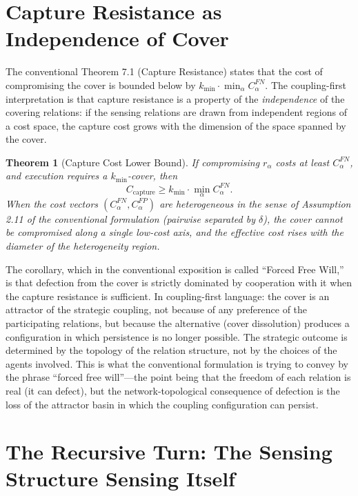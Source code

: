 \documentclass[11pt]{article}
\newtheorem{theorem}{Theorem}[section]
\theoremstyle{definition}
\theoremstyle{remark}
\begin{document}
\section{Capture Resistance as Independence of Cover}

The conventional Theorem 7.1 (Capture Resistance) states that the cost of compromising the cover is bounded below by $k_{\min} \cdot \min_\alpha C_\alpha^{FN}$. The coupling-first interpretation is that capture resistance is a property of the \emph{independence} of the covering relations: if the sensing relations are drawn from independent regions of a cost space, the capture cost grows with the dimension of the space spanned by the cover.

\begin{theorem}[Capture Cost Lower Bound]
If compromising $r_\alpha$ costs at least $C_\alpha^{FN}$, and execution requires a $k_{\min}$-cover, then
\begin{equation}
C_{\mathrm{capture}} \geq k_{\min} \cdot \min_\alpha C_\alpha^{FN}.
\end{equation}
When the cost vectors $(C_\alpha^{FN}, C_\alpha^{FP})$ are heterogeneous in the sense of Assumption 2.11 of the conventional formulation (pairwise separated by $\delta$), the cover cannot be compromised along a single low-cost axis, and the effective cost rises with the diameter of the heterogeneity region.
\end{theorem}

The corollary, which in the conventional exposition is called ``Forced Free Will,'' is that defection from the cover is strictly dominated by cooperation with it when the capture resistance is sufficient. In coupling-first language: the cover is an attractor of the strategic coupling, not because of any preference of the participating relations, but because the alternative (cover dissolution) produces a configuration in which persistence is no longer possible. The strategic outcome is determined by the topology of the relation structure, not by the choices of the agents involved. This is what the conventional formulation is trying to convey by the phrase ``forced free will''---the point being that the freedom of each relation is real (it can defect), but the network-topological consequence of defection is the loss of the attractor basin in which the coupling configuration can persist.

\section{The Recursive Turn: The Sensing Structure Sensing Itself}
\end{document}
